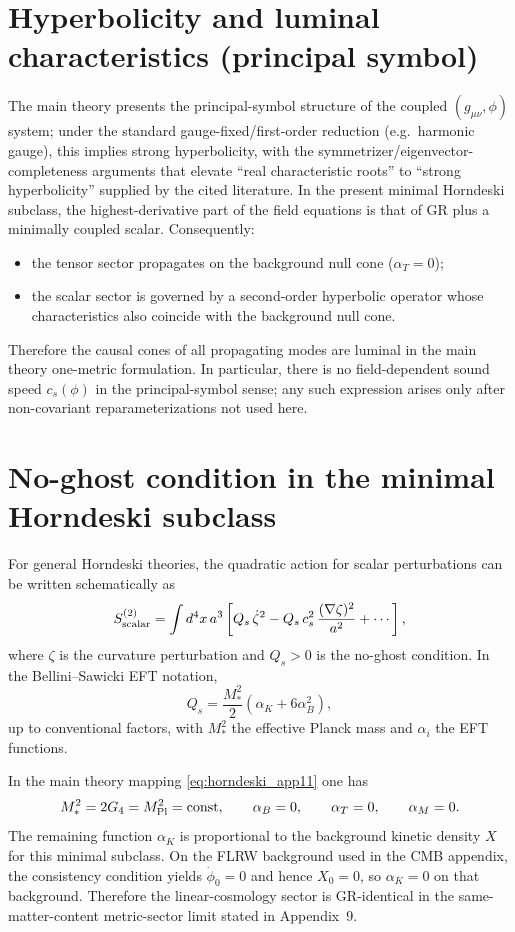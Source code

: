 \documentclass[11pt]{article}
\begin{document}
\section{Hyperbolicity and luminal characteristics (principal symbol)}\label{sec:principal}
The main theory presents the principal-symbol structure of the coupled $(g_{\mu\nu},\phi)$ system; under the standard gauge-fixed/first-order reduction (e.g.\ harmonic gauge), this implies strong hyperbolicity, with the symmetrizer/eigenvector-completeness arguments that elevate ``real characteristic roots'' to ``strong hyperbolicity'' supplied by the cited literature. In the present minimal Horndeski subclass, the highest-derivative part of the field equations is that of GR plus a minimally coupled scalar. Consequently:
\begin{itemize}
\item the tensor sector propagates on the background null cone ($\alpha_T=0$);
\item the scalar sector is governed by a second-order hyperbolic operator whose characteristics also coincide with the background null cone.
\end{itemize}
Therefore the causal cones of all propagating modes are luminal in the main theory one-metric formulation. In particular, there is no field-dependent sound speed $c_s(\phi)$ in the principal-symbol sense; any such expression arises only after non-covariant reparameterizations not used here.

\section{No-ghost condition in the minimal Horndeski subclass}\label{sec:ghost_app11}
For general Horndeski theories, the quadratic action for scalar perturbations can be written schematically as
\begin{equation}
S^{(2)}_{\rm scalar}=\int d^4x\,a^3\left[Q_s\,\dot{\zeta}^2 - Q_s\,c_s^2\,\frac{(\nabla\zeta)^2}{a^2}+\cdots\right],
\end{equation}
where $\zeta$ is the curvature perturbation and $Q_s>0$ is the no-ghost condition. In the Bellini--Sawicki EFT notation,
\begin{equation}
Q_s=\frac{M_*^2}{2}\left(\alpha_K+6\alpha_B^2\right),
\label{eq:QsBS}
\end{equation}
up to conventional factors, with $M_*^2$ the effective Planck mass and $\alpha_i$ the EFT functions.

In the main theory mapping \eqref{eq:horndeski_app11} one has
\begin{equation}
M_*^2=2G_4=M_{\rm Pl}^2=\mathrm{const},\qquad \alpha_B=0,\qquad \alpha_T=0,\qquad \alpha_M=0.
\label{eq:alphas_app11}
\end{equation}
The remaining function $\alpha_K$ is proportional to the background kinetic density $X$ for this minimal subclass. On the FLRW background used in the CMB appendix, the consistency condition yields $\dot{\phi}_0=0$ and hence $X_0=0$, so $\alpha_K=0$ on that background. Therefore the linear-cosmology sector is GR-identical in the same-matter-content metric-sector limit stated in Appendix~9.
\end{document}

